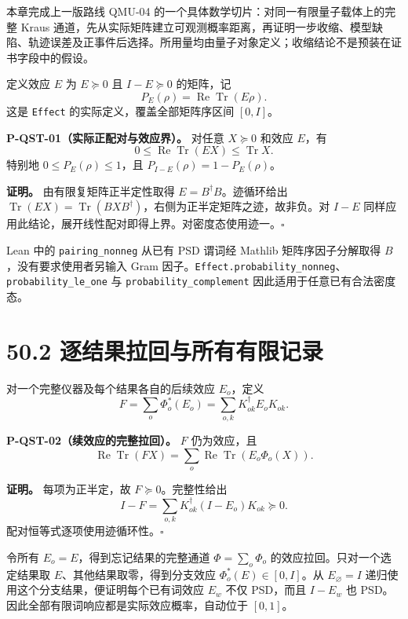\documentclass[
  11pt,
  oneside]{book}
\begin{document}
本章完成上一版路线 QMU-04 的一个具体数学切片：对同一有限量子载体上的完整
Kraus
通道，先从实际矩阵建立可观测概率距离，再证明一步收缩、模型缺陷、轨迹误差及正事件后选择。所用量均由量子对象定义；收缩结论不是预装在证书字段中的假设。

定义效应 \(E\) 为 \(E\succeq0\) 且 \(I-E\succeq0\) 的矩阵，记 \[
P_E(\rho)=\operatorname{Re}\operatorname{Tr}(E\rho).
\] 这是 \texttt{Effect} 的实际定义，覆盖全部矩阵序区间 \([0,I]\)。

\protect\hypertarget{p-qst-01}{}{}

\textbf{P-QST-01（实际正配对与效应界）。} 对任意 \(X\succeq0\) 和效应
\(E\)，有 \[
0\le\operatorname{Re}\operatorname{Tr}(EX)\le\operatorname{Tr}X.
\] 特别地 \(0\le P_E(\rho)\le1\)，且 \(P_{I-E}(\rho)=1-P_E(\rho)\)。

\textbf{证明。} 由有限复矩阵正半定性取得 \(E=B^\dagger B\)。迹循环给出
\(\operatorname{Tr}(EX)=\operatorname{Tr}(BXB^\dagger)\)，右侧为正半定矩阵之迹，故非负。对
\(I-E\)
同样应用此结论，展开线性配对即得上界。对密度态使用迹一。\(\square\)

Lean 中的 \texttt{pairing\_\allowbreak nonneg} 从已有 PSD 谓词经 Mathlib
矩阵序因子分解取得 \(B\)，没有要求使用者另输入 Gram
因子。\texttt{Effect.\allowbreak probability\_\allowbreak nonneg}、\allowbreak \texttt{probability\_\allowbreak le\_\allowbreak one}
与 \texttt{probability\_\allowbreak complement} 因此适用于任意已有合法密度态。

\section{50.2 逐结果拉回与所有有限记录}

对一个完整仪器及每个结果各自的后续效应 \(E_o\)，定义 \[
F=\sum_o\Phi_o^*(E_o)=\sum_{o,k}K_{ok}^{\dagger}E_oK_{ok}.
\]

\protect\hypertarget{p-qst-02}{}{}

\textbf{P-QST-02（续效应的完整拉回）。} \(F\) 仍为效应，且 \[
\operatorname{Re}\operatorname{Tr}(FX)
=\sum_o\operatorname{Re}\operatorname{Tr}(E_o\Phi_o(X)).
\]

\textbf{证明。} 每项为正半定，故 \(F\succeq0\)。完整性给出 \[
I-F=\sum_{o,k}K_{ok}^{\dagger}(I-E_o)K_{ok}\succeq0.
\] 配对恒等式逐项使用迹循环性。\(\square\)

令所有 \(E_o=E\)，得到忘记结果的完整通道 \(\Phi=\sum_o\Phi_o\)
的效应拉回。只对一个选定结果取 \(E\)、其他结果取零，得到分支效应
\(\Phi_o^*(E)\in[0,I]\)。从 \(E_\varnothing=I\)
递归使用这个分支结果，便证明每个已有词效应 \(E_w\) 不仅 PSD，而且
\(I-E_w\) 也 PSD。因此全部有限词响应都是实际效应概率，自动位于
\([0,1]\)。
\end{document}
